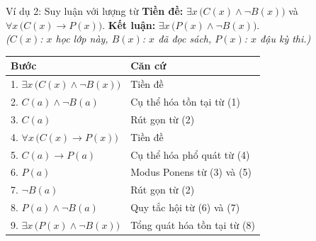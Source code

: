 \documentclass[12pt,a4paper]{article}
\begin{document}
\begin{baitap}{Ví dụ 2: Suy luận với lượng từ}
\textbf{Tiền đề:} $\exists x\,\big(C(x) \land \neg B(x)\big)$ và $\forall x\,\big(C(x) \to P(x)\big)$. \quad \textbf{Kết luận:} $\exists x\,\big(P(x) \land \neg B(x)\big)$.\\
\textit{($C(x)$: $x$ học lớp này, $B(x)$: $x$ đã đọc sách, $P(x)$: $x$ đậu kỳ thi.)}

\vspace{3pt}
\begin{center}
\renewcommand{\arraystretch}{1.2}
\begin{tabular}{ll}
\toprule
\textbf{Bước} & \textbf{Căn cứ} \\
\midrule
1. $\exists x\,\big(C(x) \land \neg B(x)\big)$ & \textcolor{PrimaryBlue}{Tiền đề} \\
2. $C(a) \land \neg B(a)$ & \textcolor{PrimaryBlue}{Cụ thể hóa tồn tại từ (1)} \\
3. $C(a)$ & \textcolor{PrimaryBlue}{Rút gọn từ (2)} \\
4. $\forall x\,\big(C(x) \to P(x)\big)$ & \textcolor{PrimaryBlue}{Tiền đề} \\
5. $C(a) \to P(a)$ & \textcolor{PrimaryBlue}{Cụ thể hóa phổ quát từ (4)} \\
6. $P(a)$ & \textcolor{PrimaryBlue}{Modus Ponens từ (3) và (5)} \\
7. $\neg B(a)$ & \textcolor{PrimaryBlue}{Rút gọn từ (2)} \\
8. $P(a) \land \neg B(a)$ & \textcolor{PrimaryBlue}{Quy tắc hội từ (6) và (7)} \\
9. \textcolor{AccentRed}{$\exists x\,\big(P(x) \land \neg B(x)\big)$} & \textcolor{PrimaryBlue}{Tổng quát hóa tồn tại từ (8)} \\
\bottomrule
\end{tabular}
\end{center}
\end{baitap}
\end{document}

